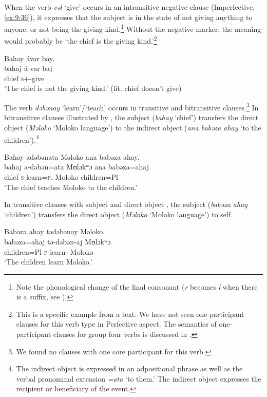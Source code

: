 When the verb \textit{vəl}  ‘give’ occurs in an intransitive negative clause (Imperfective, \ref{ex:9:36}), it expresses that the subject is in the state of not giving anything to anyone, or not being the giving kind.\footnote{Note the phonological change of the final consonant (\textit{r} becomes \textit{l} when there is a suffix, see ). } Without the negative marker, the meaning would probably be ‘the chief is the giving kind.’\footnote{This is a specific example from a text. We have not seen one-participant clauses for this verb type in Perfective aspect. %
The semantics of one-participant clauses for group four verbs is discussed in .}

\ea \label{ex:9:36}
Bahay  ávar  bay.\\
\gll  bahaj  á-var       baj\\
      chief  \textsc{s}+{\IFV}-give  {\NEG}\\
\glt  ‘The chief is not the giving kind.’ (lit. chief doesn’t give) 
\z

The verb \textit{dəbənay} ‘learn’/‘teach’ occurs in transitive and bitransitive clauses.\footnote{We found no clauses with one core participant for this verb. } In bitransitive clauses illustrated by , the subject (\textit{bahay}  ‘chief’) transfers the direct object (\textit{Məloko} ‘Moloko language’) to the indirect object (\textit{ana babəza ahay} ‘to the children’).\footnote{The indirect object is expressed in an adpositional phrase as well as the verbal pronominal extension \textit{=ata} ‘to them.’ The indirect object expresses the recipient or beneficiary of the event.} 

\ea \label{ex:9:37}
Bahay  adəbənata  Məloko  ana  babəza  ahay. \\
\gll  bahaj a-dəbən=ata   Mʊlɔkʷɔ    ana   babəza=ahaj \\
      chief  \textsc{s}-learn=\textsc{p}.{\IO}  Moloko    {\DAT} children=Pl\\
\glt  ‘The chief teaches Moloko to the children.’ 
\z

In transitive clauses with subject and direct object , the subject (\textit{babəza ahay} ‘children’) transfers the direct object (\textit{Məloko} ‘Moloko language’) to self. 

\ea \label{ex:9:38}
Babəza  ahay  tədəbənay  Məloko.\\
\gll  babəza=ahaj   tə-dəbən-aj   Mʊlɔkʷɔ\\
      children=Pl  \textsc{p}-learn{}-{\CL}  Moloko \\
\glt  ‘The children learn Moloko.’ 
\z

